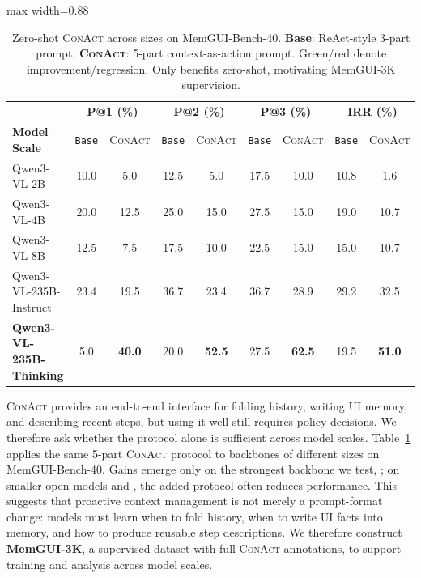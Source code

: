 \documentclass{llmxive}
\providecommand{\llmname}[1]{{\fontfamily{pcr}\selectfont{#1}}}
\providecommand{\conact}{\textsc{ConAct}\xspace}
\providecommand{\rise}[1]{#1}
\providecommand{\drop}[1]{#1}
\providecommand{\arraystretch}{1.06}
\begin{document}
\begin{table}[!htbp]
  \centering
  \footnotesize
  \renewcommand{\arraystretch}{1.06}
  \setlength{\tabcolsep}{3.6pt}
  \begin{adjustbox}{max width=0.88\linewidth}
  \begin{tabular}{@{}l | cc | cc | cc | cc@{}}
    \toprule
    & \multicolumn{2}{c|}{\textbf{P@1 (\%)}}
    & \multicolumn{2}{c|}{\textbf{P@2 (\%)}}
    & \multicolumn{2}{c|}{\textbf{P@3 (\%)}}
    & \multicolumn{2}{c}{\textbf{IRR (\%)}} \\
    \textbf{Model Scale}
      & \texttt{Base} & \conact
      & \texttt{Base} & \conact
      & \texttt{Base} & \conact
      & \texttt{Base} & \conact \\
    \midrule
    Qwen3-VL-2B
      & 10.0 & \drop{5.0}    & 12.5 & \drop{5.0}    & 17.5 & \drop{10.0}
      & 10.8 & \drop{1.6}  \\
    Qwen3-VL-4B
      & 20.0 & \drop{12.5}   & 25.0 & \drop{15.0}   & 27.5 & \drop{15.0}
      & 19.0 & \drop{10.7} \\
    Qwen3-VL-8B
      & 12.5 & \drop{7.5}    & 17.5 & \drop{10.0}   & 22.5 & \drop{15.0}
      & 15.0 & \drop{10.7} \\
    \midrule
    Qwen3-VL-235B-Instruct
      & 23.4 & \drop{19.5}   & 36.7 & \drop{23.4}   & 36.7 & \drop{28.9}
      & 29.2 & \rise{32.5} \\
    \midrule
    \rowcolor{oursrowcolor} \textbf{Qwen3-VL-235B-Thinking}
      & 5.0  & \rise{\textbf{40.0}}  & 20.0 & \rise{\textbf{52.5}}  & 27.5 & \rise{\textbf{62.5}}
      & 19.5 & \rise{\textbf{51.0}} \\
    \bottomrule
  \end{tabular}%
  \end{adjustbox}
  \caption{Zero-shot \conact across \llmname{Qwen3-VL} sizes on MemGUI-Bench-40. \textbf{Base}: ReAct-style 3-part prompt; \textbf{\conact}: 5-part context-as-action prompt. \rise{Green}/\drop{red} denote improvement/regression. Only \llmname{235B-Thinking} benefits zero-shot, motivating MemGUI-3K supervision.}
  \label{tab:ablation-model-size}
\end{table}


\conact provides an end-to-end interface for folding history, writing UI memory, and describing recent steps, but using it well still requires policy decisions. We therefore ask whether the protocol alone is sufficient across model scales. Table~\ref{tab:ablation-model-size} applies the same 5-part \conact protocol to \llmname{Qwen3-VL} backbones of different sizes on MemGUI-Bench-40. Gains emerge only on the strongest backbone we test, \llmname{Qwen3-VL-235B-Thinking}; on smaller open models and \llmname{Qwen3-VL-235B-Instruct}, the added protocol often reduces performance. This suggests that proactive context management is not merely a prompt-format change: models must learn when to fold history, when to write UI facts into memory, and how to produce reusable step descriptions. We therefore construct \textbf{MemGUI-3K}, a supervised dataset with full \conact annotations, to support training and analysis across model scales.
\end{document}
